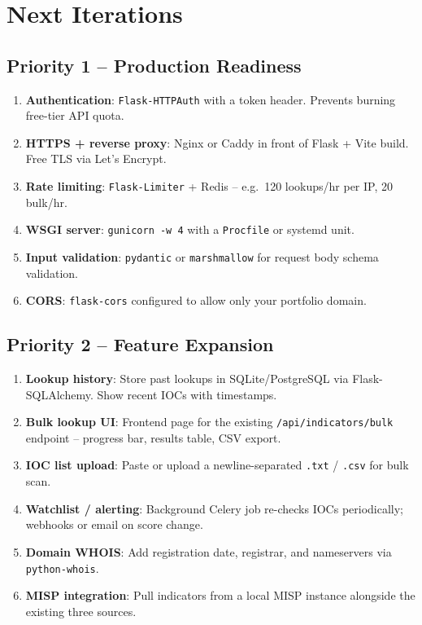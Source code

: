 \documentclass[11pt,a4paper]{article}
\begin{document}
\newpage

\section{Next Iterations}

\subsection{Priority 1 -- Production Readiness}
\begin{enumerate}
  \item \textbf{Authentication}: \texttt{Flask-HTTPAuth} with a token header. Prevents burning free-tier API quota.
  \item \textbf{HTTPS + reverse proxy}: Nginx or Caddy in front of Flask + Vite build. Free TLS via Let's Encrypt.
  \item \textbf{Rate limiting}: \texttt{Flask-Limiter} + Redis -- e.g.\ 120 lookups/hr per IP, 20 bulk/hr.
  \item \textbf{WSGI server}: \texttt{gunicorn -w 4} with a \texttt{Procfile} or systemd unit.
  \item \textbf{Input validation}: \texttt{pydantic} or \texttt{marshmallow} for request body schema validation.
  \item \textbf{CORS}: \texttt{flask-cors} configured to allow only your portfolio domain.
\end{enumerate}

\subsection{Priority 2 -- Feature Expansion}
\begin{enumerate}
  \item \textbf{Lookup history}: Store past lookups in SQLite/PostgreSQL via Flask-SQLAlchemy. Show recent IOCs with timestamps.
  \item \textbf{Bulk lookup UI}: Frontend page for the existing \texttt{/api/indicators/bulk} endpoint -- progress bar, results table, CSV export.
  \item \textbf{IOC list upload}: Paste or upload a newline-separated \texttt{.txt} / \texttt{.csv} for bulk scan.
  \item \textbf{Watchlist / alerting}: Background Celery job re-checks IOCs periodically; webhooks or email on score change.
  \item \textbf{Domain WHOIS}: Add registration date, registrar, and nameservers via \texttt{python-whois}.
  \item \textbf{MISP integration}: Pull indicators from a local MISP instance alongside the existing three sources.
\end{enumerate}
\end{document}
